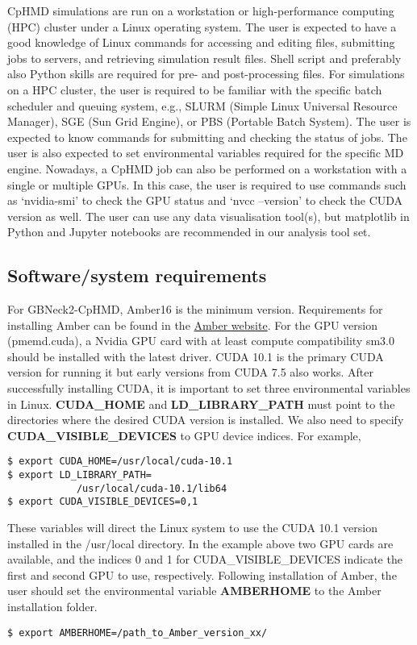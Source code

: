 CpHMD simulations are run on a workstation or high-performance computing (HPC) cluster under a Linux operating system. 
The user is expected to have a good knowledge of Linux commands for accessing and editing files, submitting jobs to servers, and retrieving simulation result files. 
Shell script and preferably also Python skills are required for pre- and post-processing files. 
For simulations on a HPC cluster, the user is required to be familiar with the specific batch scheduler and queuing system, e.g., SLURM (Simple Linux Universal Resource Manager), SGE (Sun Grid Engine), or PBS (Portable Batch System). 
The user is expected to know commands for submitting and checking the status of jobs.
The user is also expected to set environmental variables required for the specific MD engine.
Nowadays, a CpHMD job can also be performed on a workstation with a single or multiple GPUs. 
In this case, the user is required to use commands such as `nvidia-smi' to check the GPU status and `nvcc --version' to check the CUDA version as well. 
The user can use any data visualisation tool(s), but matplotlib in Python and Jupyter notebooks are recommended in our analysis tool set.  


\subsection{Software/system requirements} 
For GBNeck2-CpHMD, Amber16 is the minimum version. 
Requirements for installing Amber can be found in the \href{https://ambermd.org/Installation.php}{Amber website}. 
For the GPU version (pmemd.cuda), a Nvidia GPU card with at least compute compatibility sm3.0 should be installed with the latest driver. 
CUDA 10.1 is the primary CUDA version for running it but early versions from CUDA 7.5 also works. 
After successfully installing CUDA, it is important to set three environmental variables in Linux. 
\textbf{CUDA\_HOME} and \textbf{LD\_LIBRARY\_PATH} must point to the directories where the desired CUDA version is installed. 
We also need to specify \textbf{CUDA\_VISIBLE\_DEVICES} to GPU device indices. For example, 
\begin{lstlisting}
$ export CUDA_HOME=/usr/local/cuda-10.1
$ export LD_LIBRARY_PATH=
            /usr/local/cuda-10.1/lib64
$ export CUDA_VISIBLE_DEVICES=0,1
\end{lstlisting}
These variables will direct the Linux system to use the CUDA 10.1 version installed in the /usr/local directory.
In the example above two GPU cards are available,
and the indices 0 and 1 for CUDA\_VISIBLE\_DEVICES indicate the first and second GPU to use, respectively. 
Following installation of Amber, the user should set the environmental variable \textbf{AMBERHOME} to the Amber installation folder. 
\begin{lstlisting}
$ export AMBERHOME=/path_to_Amber_version_xx/
\end{lstlisting}

